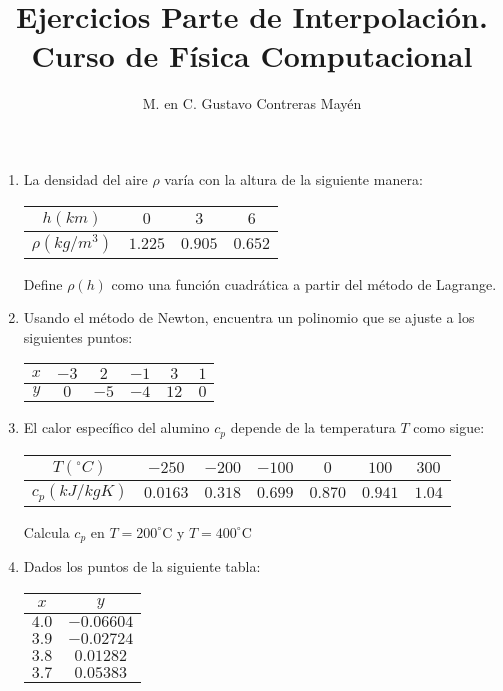 \documentclass[11pt]{article}
\title{Ejercicios Parte de Interpolaci\'{o}n. \\ Curso de Física Computacional}
\author{M. en C. Gustavo Contreras May\'{e}n}
\date{ }
\begin{document}
\maketitle
\fontsize{14}{14}\selectfont
\begin{enumerate}
\item La densidad del aire $\rho$ var\'{i}a con la altura de la siguiente manera:
\begin{table}[H]
\centering \Large
\begin{tabulary}{15cm}{c | c | c | c}
$h (km)$ & $0$ & $3$ & $6$ \\
\midrule $\rho (kg/m^{3})$ & $1.225$ & $0.905$ & $0.652$
\end{tabulary}
\end{table}
Define $\rho(h)$ como una funci\'{o}n cuadr\'{a}tica a partir del m\'{e}todo de Lagrange.
\item Usando el m\'{e}todo de Newton, encuentra un polinomio que se ajuste a los siguientes puntos:
\begin{table}[H]
\centering \Large
\begin{tabulary}{15cm}{c | c | c | c | c | c}
$x$ & $-3$ & $2$ & $-1$ & $3$ & $1$ \\
\midrule $y$ & $0$ & $-5$ & $-4$ & $12$ & $0$
\end{tabulary}
\end{table}
\item El calor espec\'{i}fico del alumino $c_{p}$ depende de la temperatura $T$ como sigue:
\begin{table}[H]
\centering \Large
\begin{tabulary}{15cm}{c | c | c | c | c | c | c}
$T(^{\circ} C)$ & $-250$ & $-200$ & $-100$ & $0$ & $100$ & $300$ \\
\midrule $c_{p} (kJ/kgK)$ & $0.0163$ & $0.318$ & $0.699$ & $0.870$ & $0.941$ & $1.04$
\end{tabulary}
\end{table}
Calcula $c_{p}$ en $T=200^{\circ}$C y $T=400^{\circ}$C
\item Dados los puntos de la siguiente tabla:
\begin{center}
\begin{tabular}{c | c }
$x$ & $y$ \\ \hline
$4.0$ & $-0.06604$\\ \hline
$3.9$ & $-0.02724$ \\ \hline
$3.8$ & $0.01282$ \\ \hline
$3.7$ & $0.05383$
\end{tabular}
\end{center}

\end{enumerate}
\end{document}
